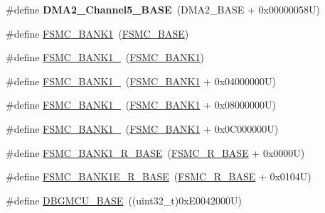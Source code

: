 \begin{DoxyCompactItemize}
\item 
\hypertarget{group___peripheral__memory__map_ga1eea983a5d68bf36f4d19fbb07955ca1}{\#define {\bfseries D\-M\-A2\-\_\-\-Channel5\-\_\-\-B\-A\-S\-E}~(D\-M\-A2\-\_\-\-B\-A\-S\-E + 0x00000058\-U)}\label{group___peripheral__memory__map_ga1eea983a5d68bf36f4d19fbb07955ca1}

\item 
\#define \hyperlink{group___peripheral__memory__map_gad9f1205bd4a5a87047167cfd08c621be}{F\-S\-M\-C\-\_\-\-B\-A\-N\-K1}~(\hyperlink{group___peripheral__memory__map_ga679200df61ecb0695d72c030fdeb50a9}{F\-S\-M\-C\-\_\-\-B\-A\-S\-E})
\item 
\#define \hyperlink{group___peripheral__memory__map_gab711931ab21fd2a4f74a673d5256e113}{F\-S\-M\-C\-\_\-\-B\-A\-N\-K1\-\_}~(\hyperlink{group___peripheral__memory__map_gad9f1205bd4a5a87047167cfd08c621be}{F\-S\-M\-C\-\_\-\-B\-A\-N\-K1})
\item 
\#define \hyperlink{group___peripheral__memory__map_gadc659d72d6ff27f3b37b1acaa430655e}{F\-S\-M\-C\-\_\-\-B\-A\-N\-K1\-\_}~(\hyperlink{group___peripheral__memory__map_gad9f1205bd4a5a87047167cfd08c621be}{F\-S\-M\-C\-\_\-\-B\-A\-N\-K1} + 0x04000000\-U)
\item 
\#define \hyperlink{group___peripheral__memory__map_ga53c3a83da3ccbaf54880dde30df549e7}{F\-S\-M\-C\-\_\-\-B\-A\-N\-K1\-\_}~(\hyperlink{group___peripheral__memory__map_gad9f1205bd4a5a87047167cfd08c621be}{F\-S\-M\-C\-\_\-\-B\-A\-N\-K1} + 0x08000000\-U)
\item 
\#define \hyperlink{group___peripheral__memory__map_ga4fe30cb75e7817aa7a1799ec5c18c842}{F\-S\-M\-C\-\_\-\-B\-A\-N\-K1\-\_}~(\hyperlink{group___peripheral__memory__map_gad9f1205bd4a5a87047167cfd08c621be}{F\-S\-M\-C\-\_\-\-B\-A\-N\-K1} + 0x0\-C000000\-U)
\item 
\#define \hyperlink{group___peripheral__memory__map_ga48d8f80d608b64cb42e7ed223066f856}{F\-S\-M\-C\-\_\-\-B\-A\-N\-K1\-\_\-\-R\-\_\-\-B\-A\-S\-E}~(\hyperlink{group___peripheral__memory__map_gaddf0e199dccba83272b20c9fb4d3aaed}{F\-S\-M\-C\-\_\-\-R\-\_\-\-B\-A\-S\-E} + 0x0000\-U)
\item 
\#define \hyperlink{group___peripheral__memory__map_gaa2ebab683a214fe3b0c628228bff3724}{F\-S\-M\-C\-\_\-\-B\-A\-N\-K1\-E\-\_\-\-R\-\_\-\-B\-A\-S\-E}~(\hyperlink{group___peripheral__memory__map_gaddf0e199dccba83272b20c9fb4d3aaed}{F\-S\-M\-C\-\_\-\-R\-\_\-\-B\-A\-S\-E} + 0x0104\-U)
\item 
\#define \hyperlink{group___peripheral__memory__map_ga4adaf4fd82ccc3a538f1f27a70cdbbef}{D\-B\-G\-M\-C\-U\-\_\-\-B\-A\-S\-E}~((uint32\-\_\-t)0x\-E0042000\-U)

\end{DoxyCompactItemize}
